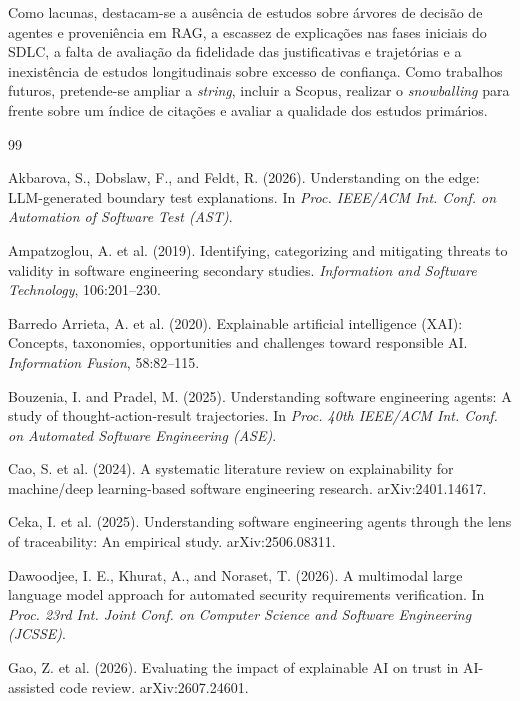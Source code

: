 \documentclass[12pt]{article}
\begin{document}
Como lacunas, destacam-se a ausência de estudos sobre árvores de decisão de
agentes e proveniência em RAG, a escassez de explicações nas fases iniciais do
SDLC, a falta de avaliação da fidelidade das justificativas e trajetórias e a
inexistência de estudos longitudinais sobre excesso de confiança. Como trabalhos
futuros, pretende-se ampliar a \textit{string}, incluir a Scopus, realizar o
\textit{snowballing} para frente sobre um índice de citações e avaliar a
qualidade dos estudos primários.

\begin{thebibliography}{99}

Akbarova, S., Dobslaw, F., and Feldt, R. (2026). Understanding on the edge:
LLM-generated boundary test explanations. In \textit{Proc. IEEE/ACM Int. Conf.
on Automation of Software Test (AST)}.

Ampatzoglou, A. et al. (2019). Identifying, categorizing and mitigating threats
to validity in software engineering secondary studies. \textit{Information and
Software Technology}, 106:201--230.

Barredo Arrieta, A. et al. (2020). Explainable artificial intelligence (XAI):
Concepts, taxonomies, opportunities and challenges toward responsible AI.
\textit{Information Fusion}, 58:82--115.

Bouzenia, I. and Pradel, M. (2025). Understanding software engineering agents: A
study of thought-action-result trajectories. In \textit{Proc. 40th IEEE/ACM Int.
Conf. on Automated Software Engineering (ASE)}.

Cao, S. et al. (2024). A systematic literature review on explainability for
machine/deep learning-based software engineering research. arXiv:2401.14617.

Ceka, I. et al. (2025). Understanding software engineering agents through the
lens of traceability: An empirical study. arXiv:2506.08311.

Dawoodjee, I. E., Khurat, A., and Noraset, T. (2026). A multimodal large language
model approach for automated security requirements verification. In \textit{Proc.
23rd Int. Joint Conf. on Computer Science and Software Engineering (JCSSE)}.

Gao, Z. et al. (2026). Evaluating the impact of explainable AI on trust in
AI-assisted code review. arXiv:2607.24601.


\end{thebibliography}
\end{document}
